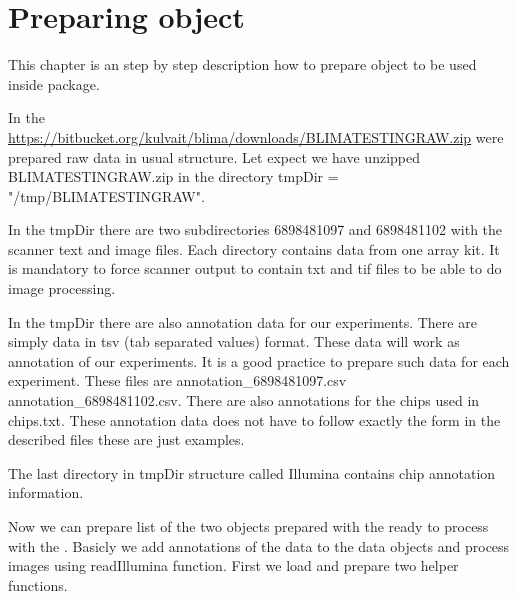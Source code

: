 \section{Preparing  object}
This chapter is an step by step description how to prepare object to be used inside  package.

In the \url{https://bitbucket.org/kulvait/blima/downloads/BLIMATESTINGRAW.zip} were prepared raw data in usual structure. Let expect we have unzipped BLIMATESTINGRAW.zip in the directory tmpDir = "/tmp/BLIMATESTINGRAW".

In the tmpDir there are two subdirectories 6898481097 and 6898481102 with the scanner text and image files. Each directory contains data from one array kit. It is mandatory to force scanner output to contain txt and tif files to be able to do image processing.

In the tmpDir there are also annotation data for our experiments. There are simply data in tsv (tab separated values) format. These data will work as annotation of our experiments. It is a good practice to prepare such data for each experiment. These files are annotation\_6898481097.csv  annotation\_6898481102.csv. There are also annotations for the chips used in chips.txt. These annotation data does not have to follow exactly the form in the described files these are just examples.

The last directory in tmpDir structure called Illumina contains chip annotation information.

Now we can prepare list of the two objects prepared with the  ready to process with the . Basicly we add annotations of the data to the data objects and process images using readIllumina function. First we load  and prepare two helper functions. 